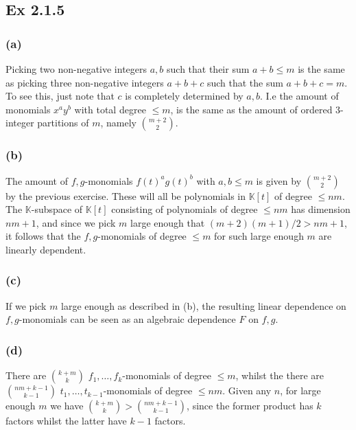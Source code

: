 \documentclass{article}
\theoremstyle{definition}
\newcommand{\K}{\mathbb{K}}
\begin{document}
\subsection*{Ex 2.1.5}

\subsubsection*{(a)}

Picking two non-negative integers $a, b$ such that their sum $a + b \leq m$ is
the same as picking three non-negative integers $a + b + c$ such that the sum
$a + b + c = m$. To see this, just note that $c$ is completely determined by
$a, b$. I.e the amount of monomials $x^ay^b$ with total degree $\leq m$, is the
same as the amount of ordered $3$-integer partitions of $m$, namely
$\binom{m + 2}{2}$.

\subsubsection*{(b)}

The amount of $f, g$-monomials $f(t)^a g(t)^b$ with $a, b \leq m$ is given by
$\binom{m+2}{2}$ by the previous exercise. These will all be polynomials in
$\K[t]$ of degree $\leq nm$. The $\K$-subspace of $\K[t]$ consisting of
polynomials of degree $\leq nm$ has dimension $nm + 1$, and since we pick $m$
large enough that $(m + 2)(m + 1) / 2 > nm + 1$, it follows that the $f,
g$-monomials of degree $\leq m$ for such large enough $m$ are linearly
dependent.

\subsubsection*{(c)}

If we pick $m$ large enough as described in (b), the resulting linear
dependence on $f, g$-monomials can be seen as an algebraic dependence $F$ on
$f, g$.

\subsubsection*{(d)}

There are $\binom{k + m}{k}$ $f_1, \ldots, f_k$-monomials of degree $\leq m$,
whilst the there are $\binom{nm + k - 1}{k - 1}$ $t_1, \ldots, t_{k -
1}$-monomials of degree $\leq nm$. Given any $n$, for large enough $m$ we have
$\binom{k + m}{k} > \binom{nm + k - 1}{k - 1}$, since the former product has
$k$ factors whilst the latter have $k - 1$ factors.
\end{document}
